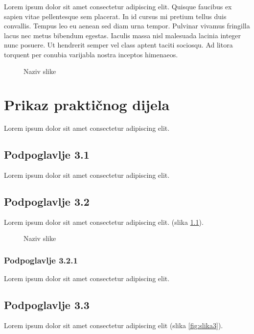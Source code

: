 Lorem ipsum dolor sit amet consectetur adipiscing elit. Quisque faucibus ex sapien vitae pellentesque sem placerat. In id cursus mi pretium tellus duis convallis. Tempus leo eu aenean sed diam urna tempor. Pulvinar vivamus fringilla lacus nec metus bibendum egestas. Iaculis massa nisl malesuada lacinia integer nunc posuere. Ut hendrerit semper vel class aptent taciti sociosqu. Ad litora torquent per conubia varijabla nostra inceptos himenaeos.

\begin{figure}[H]
    \centering
    \caption{Naziv slike}
    \label{fig:slika1}
\end{figure}

\chapter{Prikaz praktičnog dijela}
Lorem ipsum dolor sit amet consectetur adipiscing elit.

\section{Podpoglavlje 3.1}
Lorem ipsum dolor sit amet consectetur adipiscing elit.

\section{Podpoglavlje 3.2}
Lorem ipsum dolor sit amet consectetur adipiscing elit. (slika \ref{fig:slika2}).

\begin{figure}[H]
    \centering
    \caption{Naziv slike}
    \label{fig:slika2}
\end{figure}

\subsection{Podpoglavlje 3.2.1}
Lorem ipsum dolor sit amet consectetur adipiscing elit.

\section{Podpoglavlje 3.3}
Lorem ipsum dolor sit amet consectetur adipiscing elit (slika \ref{fig:slika3}).

